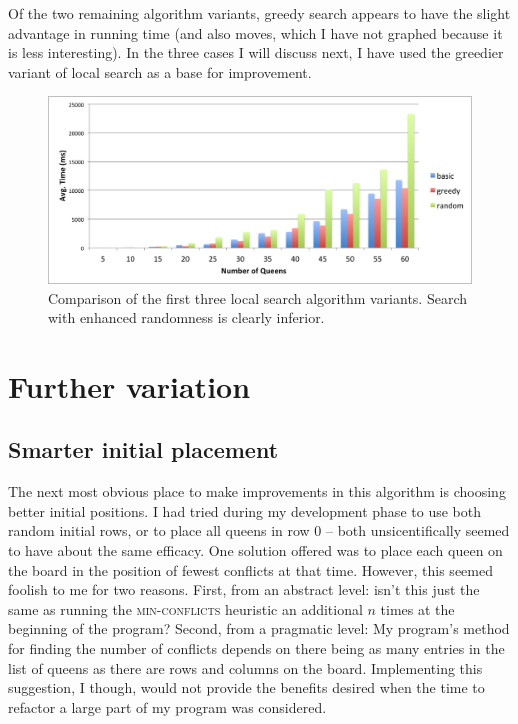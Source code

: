 \documentclass{article}
\begin{document}
\begin{doublespace}
Of the two remaining algorithm variants, greedy search appears to have the slight advantage in running time (and also moves, which I have not graphed because it is less interesting). In the three cases I will discuss next, I have used the greedier variant of local search as a base for improvement.

\begin{figure}[ht!]
\centering
\includegraphics[width=6.5in]{./compare1-3.png}
\caption{Comparison of the first three local search algorithm variants. Search with enhanced randomness is clearly inferior.}
\end{figure}

\section{Further variation}
\subsection{Smarter initial placement}
The next most obvious place to make improvements in this algorithm is choosing better initial positions. I had tried during my development phase to use both random initial rows, or to place all queens in row 0 -- both unsicentifically seemed to have about the same efficacy. One solution offered was to place each queen on the board in the position of fewest conflicts at that time. However, this seemed foolish to me for two reasons. First, from an abstract level: isn't this just the same as running the \textsc{min-conflicts} heuristic an additional $n$ times at the beginning of the program? Second, from a pragmatic level: My program's method for finding the number of conflicts depends on there being as many entries in the list of queens as there are rows and columns  on the board. Implementing this suggestion, I though, would not provide the benefits desired when the time to refactor a large part of my program was considered.


\end{doublespace}
\end{document}
